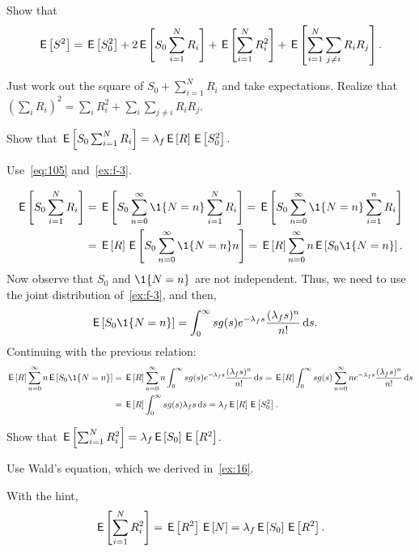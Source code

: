 \begin{exercise}\label{ex:81}
Show that
\begin{equation*}
 \,\mathsf{E}\left[S^2\right] = \,\mathsf{E}\left[S_0^2\right] + 2\,\mathsf{E}\left[S_0 \sum_{i=1}^N R_i\right] + \,\mathsf{E}\left[\sum_{i=1}^N R_i^2\right] + \,\mathsf{E}\left[\sum_{i=1}^N \sum_{j\neq i} R_i R_j\right].
\end{equation*}
\begin{solution}
 Just work out the square of $S_0+\sum_{i=1}^N R_i$ and take expectations. Realize that $(\sum_i R_i)^2 = \sum_i R_i^2 + \sum_i\sum_{j\neq i} R_i R_j$.
\end{solution}
\end{exercise}


\begin{exercise}
Show that  $\,\mathsf{E}\left[S_0 \sum_{i=1}^N R_i\right] = \lambda_f \,\mathsf{E}\left[R\right] \,\mathsf{E}\left[S_0^2\right]. $
\begin{hint}
  Use~\cref{eq:105} and~\cref{ex:f-3}.
\end{hint}
\begin{solution}
  \begin{align*}
    \E{S_0 \sum_{i=1}^N R_i}
    &=   \E{S_0 \sum_{n=0}^\infty \1{N=n} \sum_{i=1}^N R_i}
    =   \E{S_0 \sum_{n=0}^\infty \1{N=n} \sum_{i=1}^n R_i} \\
    &=   \E R \E{S_0 \sum_{n=0}^\infty \1{N=n} n }
    =   \E R \sum_{n=0}^\infty n \E{S_0 \1{N=n}}.
  \end{align*}
  Now observe that $S_0$ and  $\1{N=n}$ are not independent. Thus, we need to use the joint distribution of~\cref{ex:f-3}, and then,
  \begin{align*}
    \E{S_0 \1{N=n}}
    &=  \int_0^\infty s  g(s) e^{-\lambda_f s} \frac{(\lambda_f s)^n}{n!} \d s.
  \end{align*}
  Continuing with the previous relation:
  \begin{align*}
    \E R \sum_{n=0}^\infty n \E{S_0 \1{N=n}}
    & =  \E R \sum_{n=0}^\infty n \int_0^\infty s  g(s) e^{-\lambda_f s} \frac{(\lambda_f s)^n}{n!} \d s
     =  \E R \int_0^\infty s  g(s) \sum_{n=0}^\infty n e^{-\lambda_f s} \frac{(\lambda_f s)^n}{n!} \d s \\
    & =  \E R \int_0^\infty s  g(s) \lambda_f s \d s
     =  \lambda_f \E R \E{S_0^2}.
  \end{align*}
\end{solution}
\end{exercise}

\begin{exercise}\label{ex:f-82}
 Show that $\,\mathsf{E}\left[\sum_{i=1}^N R_i^2\right] = \lambda_f \,\mathsf{E}\left[S_0 \right]\,\mathsf{E}\left[R^2\right]$.
\begin{hint}
 Use Wald's equation, which we derived in~\cref{ex:16}.
\end{hint}
\begin{solution}
  With the hint,
 \begin{align*}
 \,\mathsf{E}\left[\sum_{i=1}^N R_i^2\right] = \,\mathsf{E}\left[R^2\right]\,\mathsf{E}\left[N\right] = \lambda_f \,\mathsf{E}\left[S_0\right] \,\mathsf{E}\left[R^2\right].
 \end{align*}
\end{solution}
\end{exercise}

